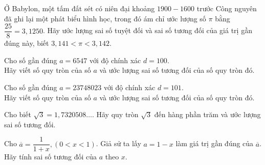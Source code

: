 \baitaptl
\setcounter{bt}{0}
\begin{bt}%
	Ở Babylon, một tấm đất sét có niên đại khoảng $ 1900-1600 $ trước Công nguyên đã ghi lại một phát biểu hình học, trong đó ám chỉ ước lượng số $ \pi $ bằng $ \dfrac{25}{8} =3{,}1250$. Hãy ước lượng sai số tuyệt đối và sai số tương đối của giá trị gần đúng này, biết $ 3{,}141<\pi<3{,}142 $.
\end{bt}

\begin{bt}%
	Cho số gần đúng $ a =6547$ với độ chính xác $ d=100 $.\\
	Hãy viết số quy tròn của số $ a $ và ước lượng sai số tương đối của số quy tròn đó.
\end{bt}

\begin{bt}%
	Cho số gần đúng $ a =23748023$ với độ chính xác $ d=101 $.\\
	Hãy viết số quy tròn của số $ a $ và ước lượng sai số tương đối của số quy tròn đó.
\end{bt}

\begin{bt}%
	Cho biết $\sqrt{3}=1{,}7320508\ldots$. Hãy quy tròn $ \sqrt{3} $ đến hàng phần trăm và ước lượng sai số tương đối.
	
\end{bt}

\begin{bt}%
	Cho $ \overline{a}=\dfrac{1}{1+x}, (0<x<1)$. Giả sử ta lấy $ a=1-x $ làm giá trị gần đúng của $ \overline{a} $. Hãy tính sai số tương đối của $ a $ theo $ x $.
\end{bt}

